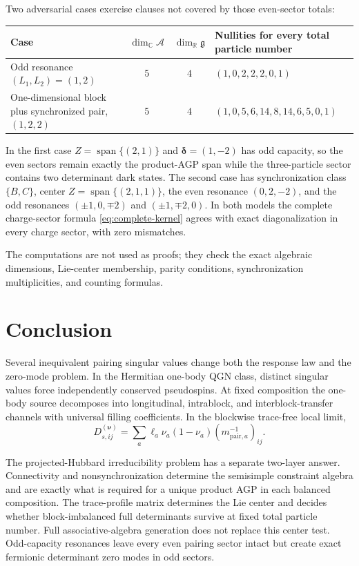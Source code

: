\documentclass[11pt]{article}
\numberwithin{equation}{section}
\newcommand{\Span}{\operatorname{span}}
\newcommand{\cA}{\mathcal A}
\newcommand{\fg}{\mathfrak g}
\begin{document}
Two adversarial cases exercise clauses not covered by those even-sector totals:
\begin{center}
\small
\begin{tabular}{>{\raggedright\arraybackslash}p{}cc>{\raggedright\arraybackslash}p{}}
\toprule
Case & $\dim_{\mathbb C}\cA$ & $\dim_{\mathbb R}\fg$ & Nullities for every total particle number\\
\midrule
Odd resonance $(L_1,L_2)=(1,2)$ & $5$ & $4$ & $(1,0,2,2,2,0,1)$\\
One-dimensional block plus synchronized pair, $(1,2,2)$ & $5$ & $4$ & $(1,0,5,6,14,8,14,6,5,0,1)$\\
\bottomrule
\end{tabular}
\end{center}
In the first case $Z=\Span\{(2,1)\}$ and $\boldsymbol\delta=(1,-2)$ has odd capacity, so the even sectors remain exactly the product-AGP span while the three-particle sector contains two determinant dark states.  The second case has synchronization class $\{B,C\}$, center $Z=\Span\{(2,1,1)\}$, the even resonance $(0,2,-2)$, and the odd resonances $(\pm1,0,\mp2)$ and $(\pm1,\mp2,0)$.  In both models the complete charge-sector formula \eqref{eq:complete-kernel} agrees with exact diagonalization in every charge sector, with zero mismatches.

The computations are not used as proofs; they check the exact algebraic dimensions, Lie-center membership, parity conditions, synchronization multiplicities, and counting formulas.

\section{Conclusion}

Several inequivalent pairing singular values change both the response law and the zero-mode problem.  In the Hermitian one-body QGN class, distinct singular values force independently conserved pseudospins.  At fixed composition the one-body source decomposes into longitudinal, intrablock, and interblock-transfer channels with universal filling coefficients.  In the blockwise trace-free local limit,
\begin{equation}
 D_{s,ij}^{(\boldsymbol\nu)}
 =
 \sum_a\ell_a\nu_a(1-\nu_a)
 (m_{\mathrm{pair},a}^{-1})_{ij}.
 \label{eq:conclusion-law}
\end{equation}

The projected-Hubbard irreducibility problem has a separate two-layer answer.  Connectivity and nonsynchronization determine the semisimple constraint algebra and are exactly what is required for a unique product AGP in each balanced composition.  The trace-profile matrix determines the Lie center and decides whether block-imbalanced full determinants survive at fixed total particle number.  Full associative-algebra generation does not replace this center test.  Odd-capacity resonances leave every even pairing sector intact but create exact fermionic determinant zero modes in odd sectors.
\end{document}
